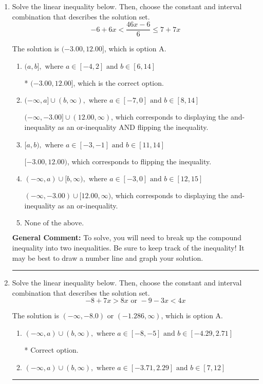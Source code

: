 \documentclass{extbook}[14pt]
\newcommand{\litem}[1]{\item #1

\rule{\textwidth}{0.4pt}}
\begin{document}
\begin{enumerate}\litem{
Solve the linear inequality below. Then, choose the constant and interval combination that describes the solution set.
\[ -6 + 6 x < \frac{46 x - 6}{6} \leq 7 + 7 x \]

The solution is \( (-3.00, 12.00] \), which is option A.\begin{enumerate}[label=\Alph*.]
\item \( (a, b], \text{ where } a \in [-4, 2] \text{ and } b \in [6, 14] \)

* $(-3.00, 12.00]$, which is the correct option.
\item \( (-\infty, a] \cup (b, \infty), \text{ where } a \in [-7, 0] \text{ and } b \in [8, 14] \)

$(-\infty, -3.00] \cup (12.00, \infty)$, which corresponds to displaying the and-inequality as an or-inequality AND flipping the inequality.
\item \( [a, b), \text{ where } a \in [-3, -1] \text{ and } b \in [11, 14] \)

$[-3.00, 12.00)$, which corresponds to flipping the inequality.
\item \( (-\infty, a) \cup [b, \infty), \text{ where } a \in [-3, 0] \text{ and } b \in [12, 15] \)

$(-\infty, -3.00) \cup [12.00, \infty)$, which corresponds to displaying the and-inequality as an or-inequality.
\item \( \text{None of the above.} \)


\end{enumerate}

\textbf{General Comment:} To solve, you will need to break up the compound inequality into two inequalities. Be sure to keep track of the inequality! It may be best to draw a number line and graph your solution.
}
\litem{
Solve the linear inequality below. Then, choose the constant and interval combination that describes the solution set.
\[ -8 + 7 x > 8 x \text{ or } -9 - 3 x < 4 x \]

The solution is \( (-\infty, -8.0) \text{ or } (-1.286, \infty) \), which is option A.\begin{enumerate}[label=\Alph*.]
\item \( (-\infty, a) \cup (b, \infty), \text{ where } a \in [-8, -5] \text{ and } b \in [-4.29, 2.71] \)

 * Correct option.
\item \( (-\infty, a) \cup (b, \infty), \text{ where } a \in [-3.71, 2.29] \text{ and } b \in [7, 12] \)


\end{enumerate}}
\end{enumerate}
\end{document}
